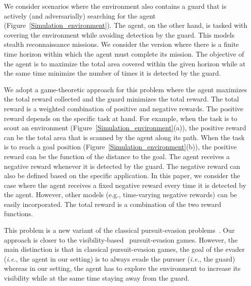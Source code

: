 \documentclass[10 pt, conference]{ieeeconf}
\newcommand{\ie}{\emph{i.e.}}
\begin{document}
We consider scenarios where the environment also contains a guard that is actively (and adversarially) searching for the agent (Figure~\ref{Simulation_environment}). The agent, on the other hand, is tasked with covering the environment while avoiding detection by the guard. This models stealth reconnaissance missions. We consider the version where there is a finite time horizon within which the agent must complete its mission. The objective of the agent is to maximize the total area covered within the given horizon while at the same time minimize the number of times it is detected by the guard.


We adopt a game-theoretic approach for this problem where the agent maximizes the total reward collected and the guard minimizes the total reward. The total reward is a weighted combination of positive and negative rewards. The positive reward depends on the specific task at hand. For example, when the task is to scout an environment (Figure~\ref{Simulation_environment}(a)), the positive reward can be the total area that is scanned by the agent along its path. When the task is to reach a goal position (Figure~\ref{Simulation_environment}(b)), the positive reward can be the function of the distance to the goal. %
The agent receives a negative reward whenever it is detected by the guard. The negative reward can also be defined based on the specific application. In this paper, we consider the case where the agent receives a fixed negative reward every time it is detected by the agent. However, other models (e.g., time-varying negative rewards) can be easily incorporated. The total reward is a combination of the two reward functions.

This problem is a new variant of the classical pursuit-evasion problems~\cite{zhang2016non,isler2005randomized}. 
Our approach is closer to the visibility-based~\cite{sachs2004visibility,gerkey2006visibility,stiffler2017complete, bandyopadhyay2004stealth, MaBeMuBeHu18} pursuit-evasion games.  However, the main distinction is that in classical pursuit-evasion games, the goal of the evader (\ie, the agent in our setting) is to always evade the pursuer (\ie, the guard) whereas in our setting, the agent has to explore the environment to increase its visibility while at the same time staying away from the guard. 
\end{document}

